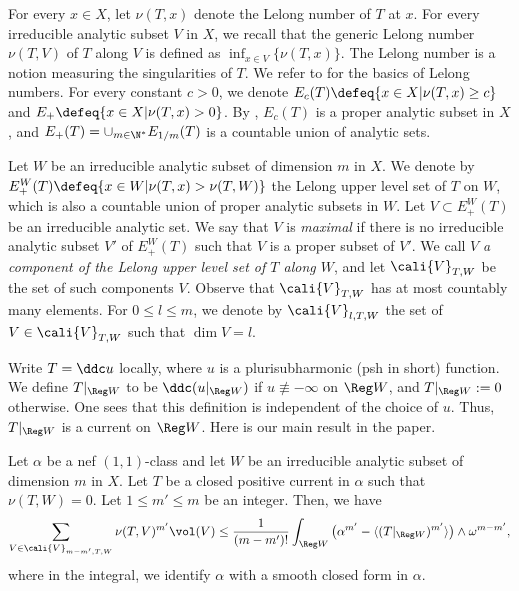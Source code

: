     For every $x \in X$, let $\nu(T,x)$ denote the Lelong number of $T$ at $x$.  For every irreducible analytic subset $V$ in $X$, we recall that the generic Lelong number $\nu(T,V)$ of $T$ along $V$ is defined as $ \inf_{x \in V} \{\nu(T,x)\}$. The Lelong number is a notion measuring the singularities of $T$. We refer to \cite{Demailly_ag} for the basics of Lelong numbers. For every constant $c>0$,  we denote $E_{c}(T) \defeq \{x \in X | \nu(T,x) \ge c\}$ and $E_{+} \defeq \{x \in X | \nu(T,x)>0\}$. By \cite{Siu},  $E_{c}(T)$ is a proper analytic subset in $X$, and $E_{+}(T)= \cup_{m \in \N^*} E_{1/m}(T)$ is a countable union of analytic sets. 


    Let $W$ be an irreducible analytic subset of dimension $m$ in $X$. We denote by $E_{+}^{W}(T) \defeq \{x \in W | \nu(T,x) > \nu(T,W)\}$ the Lelong upper level set of $T$ on $W$, which is also a countable union of proper analytic subsets in $W$. 
    Let $V \subset E_{+}^{W}(T)$ be an irreducible analytic set. We say that $V$ is \emph{maximal} if there is no irreducible analytic subset $V'$ of  $E_{+}^{W}(T)$  such that $V$ is a proper subset of $V'$.  We call $V$ \emph{a component of the Lelong upper level set of $T$ along $W$}, and let $\cali{V}_{T,W}$ be the set of such components $V$. Observe that $\cali{V}_{T,W}$ has at most countably many elements. For $0 \leq l \leq m$, we denote by $\cali{V}_{l,T,W}$ the set of $V \in \cali{V}_{T,W}$ such that $\dim V=l$.

    Write $T= \ddc u$ locally, where $u$ is a plurisubharmonic (psh in short) function. We define $T|_{\Reg W}$ to be $\ddc (u|_{\Reg W})$ if $u \not  \equiv -\infty$ on $\Reg W$, and $T|_{\Reg W}:= 0$ otherwise. One sees that this definition is independent of the choice of $u$. Thus, $T|_{\Reg W}$ is a current on $\Reg W$. Here is our main result in the paper.

     
    \begin{theorem}\label{the-kahlerself-intersec} 
        Let $\alpha$ be a nef $(1,1)$-class and let $W$ be an irreducible analytic subset of dimension $m$ in $X$. Let $T$ be a closed positive current in $\alpha$ such that $\nu(T,W)=0$. Let $1\le m' \le m$ be an integer. Then, we have  
        \begin{align}\label{ine-obstructionselfinterkahler}
            \sum_{V \in \cali{V}_{m-m',T,W}} \nu(T,V)^{m'} \vol(V)  \le 
            \frac{1}{(m-m')!}\int_{\Reg W} \big(\alpha^{m'}   -\langle (T|_{\Reg W})^{m'} \rangle \big) \wedge \omega^{m-m'},
        \end{align}
        where in the integral, we identify $\alpha$ with a smooth closed form in $\alpha$. 
    \end{theorem}

